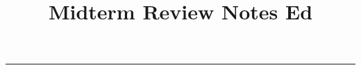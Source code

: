 \documentclass[11pt, twoside, exarticle]{article}
\title{\textbf{Midterm Review Notes Ed \docbuild}}
\begin{document}

\makeatletter
\hfil\parbox[t]{0.7\textwidth}{\centering\LARGE\bfseries\@title}\par
\kern0.5cm \hrule\kern0.5cm
\makeatother



\thispagestyle{empty}




\clearpage


\thispagestyle{empty}




\clearpage


\thispagestyle{empty}

\renewcommand{\contentsname}{Table of Contents}

\tableofcontents
\end{document}
